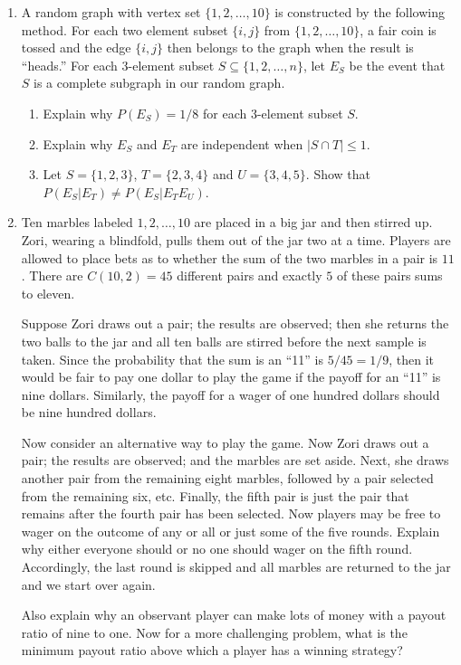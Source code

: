 \begin{enumerate}
\item A random graph with vertex set $\{1,2,\dots,10\}$ is constructed by
the following method.  For each two element subset $\{i,j\}$ from $\{1,2,\dots,10\}$,
a fair coin is tossed and the edge $\{i,j\}$ then belongs to the graph when
the result is ``heads.''  For each $3$-element subset $S\subseteq\{1,2,\dots,n\}$,
let $E_S$ be the event that $S$ is a complete subgraph in our random graph.
\begin{enumerate}  
\item Explain why $P(E_S)= 1/8$ for each $3$-element subset $S$.
\item Explain why $E_S$ and $E_T$ are independent when $|S\cap T|\le 1$.
\item Let $S=\{1,2,3\}$, $T=\{2,3,4\}$ and $U=\{3,4,5\}$.  Show that
$P(E_S|E_T)\neq P(E_S|E_TE_U)$.
\end{enumerate}

\item Ten marbles labeled $1,2,\dots,10$ are placed in a big jar and
  then stirred up.  Zori, wearing a blindfold, pulls them out of the
  jar two at a time.  Players are allowed to place bets as to whether
  the sum of the two marbles in a pair is $11$.  There are $C(10,2)=
  45$ different pairs and exactly $5$ of these pairs sums to eleven.

  Suppose Zori draws out a pair; the results are observed; then
  she returns the two balls to the jar and all ten balls are stirred
  before the next sample is taken.  Since the probability that the sum
  is an ``11'' is $5/45=1/9$, then it would be fair to pay one dollar
  to play the game if the payoff for an ``11'' is nine dollars.
  Similarly, the payoff for a wager of one hundred dollars should be
  nine hundred dollars.

  Now consider an alternative way to play the game.  Now Zori
  draws out a pair; the results are observed; and the marbles are set
  aside.  Next, she draws another pair from the remaining eight
  marbles, followed by a pair selected from the remaining six, etc.
  Finally, the fifth pair is just the pair that remains after the
  fourth pair has been selected.  Now players may be free to wager on
  the outcome of any or all or just some of the five rounds.  Explain
  why either everyone should or no one should wager on the fifth round.
  Accordingly, the last round is skipped and all marbles are returned
  to the jar and we start over again.

  Also explain why an observant player can make lots of money with a payout
  ratio of nine to one.  Now for a more challenging problem, what is
  the minimum payout ratio above which a player has a winning
  strategy?
\end{enumerate}

